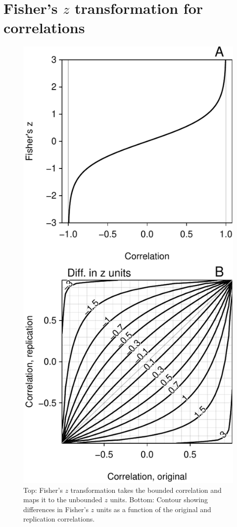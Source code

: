 \documentclass[doc,a4paper,floatsintext,draftfirst]{apa6}
\makeatletter
\def\maxwidth{ %
  \ifdim\Gin@nat@width>\linewidth
    \linewidth
  \else
    \Gin@nat@width
  \fi
}
\makeatother
\begin{document}
\printbibliography


\clearpage
\appendix

\section{Fisher's $z$ transformation for correlations}


\begin{figure}
\includegraphics[width=\maxwidth]{figure/zexp-1} \caption{Top: Fisher's $z$ transformation takes the bounded correlation and maps it to the unbounded $z$ units. Bottom: Contour showing differences in Fisher's $z$ units as a function of the original and replication correlations.}\label{fig:zexp1}
\end{figure}
\end{document}
